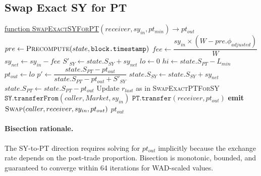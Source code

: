 \subsection{Swap Exact SY for PT}

\begin{algorithm}[H]
\caption{Swap Exact SY for PT}
\underline{function \textsc{SwapExactSYForPT}}$(receiver, sy_{in}, pt_{min}) \rightarrow pt_{out}$\;
\BlankLine
$pre \gets \textsc{Precompute}(state, \texttt{block.timestamp})$\;
\BlankLine
{}
$fee \gets \dfrac{sy_{in} \times (W - pre.\phi_{adjusted})}{W}$\;
$sy_{net} \gets sy_{in} - fee$\;
$S'_{SY} \gets state.S_{SY} + sy_{net}$\;
\BlankLine
{}
$lo \gets 0$\;
$hi \gets state.S_{PT} - L_{min}$\;
$pt_{out} \gets lo$\;
\BlankLine
$p' \gets \dfrac{state.S_{PT} - pt_{out}}{state.S_{PT} - pt_{out} + S'_{SY}}$\;
\BlankLine
{}
$state.S_{SY} \gets state.S_{SY} + sy_{net}$\;
$state.S_{PT} \gets state.S_{PT} - pt_{out}$\;
Update $r_{last}$ as in \textsc{SwapExactPTForSY}\;
\BlankLine
$\texttt{SY.transferFrom}(caller, Market, sy_{in})$\;
$\texttt{PT.transfer}(receiver, pt_{out})$\;
\BlankLine
\textbf{emit} $\textsc{Swap}(caller, receiver, sy_{in}, pt_{out})$\;
\Return $pt_{out}$\;
\end{algorithm}

\paragraph{Bisection rationale.} The SY-to-PT direction requires solving for $pt_{out}$ implicitly because the exchange rate depends on the post-trade proportion. Bisection is monotonic, bounded, and guaranteed to converge within 64 iterations for WAD-scaled values.


